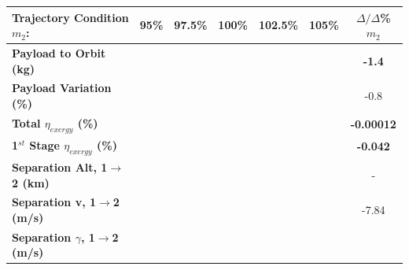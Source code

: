 \begin{table}[ht]
\centering
\begin{tabular}{l c c c c c c} 
	\hline \textbf{Trajectory Condition}   \qquad  $m_{2}$:
	&95\%
	&97.5\%
	&100\%
	&102.5\%
	&105\%
	& $\Delta/\Delta$\%$m_{2}$
	\\
	\hline \textbf{Payload to Orbit (kg)}
	& \textbf{\PayloadToOrbitmSPARTANNinetyFive}
	& \textbf{\PayloadToOrbitmSPARTANNinetySevenFive}
	& \textbf{\PayloadToOrbitmSPARTANStandard}
	& \textbf{\PayloadToOrbitmSPARTANOneHundredTwoFive}
	& \textbf{\PayloadToOrbitmSPARTANOneHundredFive}
	&\textbf{-1.4}
	\\
	\textbf{Payload Variation (\%)}
	& \PayloadVarmSPARTANNinetyFive
	& \PayloadVarmSPARTANNinetySevenFive
	& \PayloadVarmSPARTANStandard
	& \PayloadVarmSPARTANOneHundredTwoFive
	& \PayloadVarmSPARTANOneHundredFive
	&-0.8
	\\
	\textbf{Total $\eta_{exergy}$ (\%)}
	& \textbf{\totalExergyEffmSPARTANNinetyFive}
	& \textbf{\totalExergyEffmSPARTANNinetySevenFive}
	& \textbf{\totalExergyEffmSPARTANStandard}
	& \textbf{\totalExergyEffmSPARTANOneHundredTwoFive}
	& \textbf{\totalExergyEffmSPARTANOneHundredFive}
	& \textbf{-0.00012}
	\\
	\hline 
	\textbf{1$^{st}$ Stage $\eta_{exergy}$ (\%)}
	& \textbf{\firstExergyEffmSPARTANNinetyFive}
	& \textbf{\firstExergyEffmSPARTANNinetySevenFive}
	& \textbf{\firstExergyEffmSPARTANStandard}
	& \textbf{\firstExergyEffmSPARTANOneHundredTwoFive}
	& \textbf{\firstExergyEffmSPARTANOneHundredFive}
	& \textbf{-0.042}
	\\
	\textbf{Separation Alt, 1$\rightarrow$2 (km)}
	& \firstsecondSeparationAltmSPARTANNinetyFive
	& \firstsecondSeparationAltmSPARTANNinetySevenFive
	& \firstsecondSeparationAltmSPARTANStandard
	& \firstsecondSeparationAltmSPARTANOneHundredTwoFive
	& \firstsecondSeparationAltmSPARTANOneHundredFive
	& -
	\\
	\textbf{Separation v, 1$\rightarrow$2 (m/s)}
	& \firstsecondSeparationvmSPARTANNinetyFive
	& \firstsecondSeparationvmSPARTANNinetySevenFive
	& \firstsecondSeparationvmSPARTANStandard
	& \firstsecondSeparationvmSPARTANOneHundredTwoFive
	& \firstsecondSeparationvmSPARTANOneHundredFive
	&-7.84
	\\
	\textbf{Separation $\gamma$, 1$\rightarrow$2 (m/s)}
	& \firstsecondSeparationgammamSPARTANNinetyFive
	& \firstsecondSeparationgammamSPARTANNinetySevenFive
	& \firstsecondSeparationgammamSPARTANStandard
	& \firstsecondSeparationgammamSPARTANOneHundredTwoFive
	& \firstsecondSeparationgammamSPARTANOneHundredFive

\end{tabular}
\end{table}
